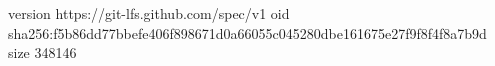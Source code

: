 version https://git-lfs.github.com/spec/v1
oid sha256:f5b86dd77bbefe406f898671d0a66055c045280dbe161675e27f9f8f4f8a7b9d
size 348146
